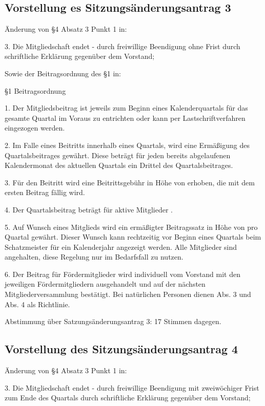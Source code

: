 \documentclass[a4paper,12pt,titlepage]{scrartcl}
\begin{document}
\subsection{Vorstellung es Sitzungsänderungsantrag 3}
Änderung von §4  Absatz 3 Punkt 1 in:

\begin{displayquote}
3. Die Mitgliedschaft endet - durch freiwillige Beendigung ohne Frist durch schriftliche Erklärung gegenüber dem Vorstand;
\end{displayquote}

Sowie der Beitragsordnung des §1 in: 
\begin{displayquote}
§1 Beitragsordnung

1. Der Mitgliedsbeitrag ist jeweils zum Beginn eines Kalenderquartals für das gesamte Quartal im Voraus zu entrichten oder kann per Lastschriftverfahren eingezogen werden.

2. Im Falle eines Beitritts innerhalb eines Quartals, wird eine Ermäßigung des Quartalsbeitrages gewährt. Diese beträgt für jeden bereits abgelaufenen Kalendermonat des aktuellen Quartals ein Drittel des Quartalsbeitrages.

3. Für den Beitritt wird eine Beitrittsgebühr in Höhe von  erhoben, die mit dem ersten Beitrag fällig wird.

4. Der Quartalsbeitrag beträgt für aktive Mitglieder .

5. Auf Wunsch eines Mitglieds wird ein ermäßigter Beitragssatz in Höhe von  pro Quartal gewährt. Dieser Wunsch kann rechtzeitig vor Beginn eines Quartals beim Schatzmeister für ein Kalenderjahr angezeigt werden. Alle Mitglieder sind angehalten, diese Regelung nur im Bedarfsfall zu nutzen.

6. Der Beitrag für Fördermitglieder wird individuell vom Vorstand mit den jeweiligen Fördermitgliedern ausgehandelt und auf der nächsten Mitgliederversammlung bestätigt. Bei natürlichen Personen dienen Abs. 3 und Abs. 4 als Richtlinie.
\end{displayquote}

Abstimmung über Satzungsänderungsantrag 3: 17 Stimmen dagegen.

\subsection{Vorstellung des Sitzungsänderungsantrag 4}
Änderung von §4  Absatz 3 Punkt 1 in:
\begin{displayquote}
3. Die Mitgliedschaft endet - durch freiwillige Beendigung mit zweiwöchiger Frist zum Ende des Quartals durch schriftliche Erklärung gegenüber dem Vorstand;
\end{displayquote}
\end{document}

